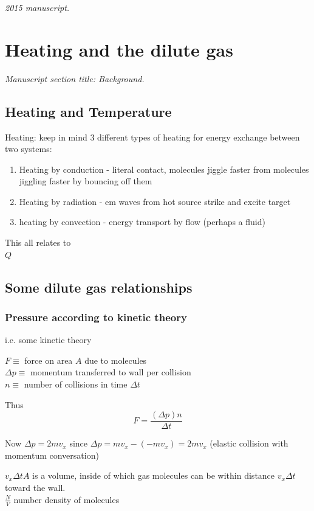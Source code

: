 \noindent\textit{2015 manuscript.}

\section{Heating and the dilute gas}
\noindent\textit{Manuscript section title: Background.}
\cite{RBaierlein1999}
\subsection{Heating and Temperature}

Heating: keep in mind 3 different types of heating for energy exchange between two systems:

\begin{enumerate}
  \item Heating by conduction - literal contact, molecules jiggle faster from molecules jiggling faster by bouncing off them
  \item Heating by radiation - em waves from hot source strike and excite target
  \item heating by convection - energy transport by flow (perhaps a fluid)
\end{enumerate}

This all relates to \\
$Q$

\subsection{Some dilute gas relationships}
\label{sec:dilute-gas}

\subsubsection*{Pressure according to kinetic theory} i.e. some kinetic theory

$F \equiv $ force on area $A$ due to molecules \\
$\Delta p \equiv $ momentum transferred to wall per collision \\
$n \equiv$ number of collisions in time $\Delta t$

Thus
\[
F = \frac{ (\Delta p)n }{ \Delta t }
\]

Now $\Delta p = 2 m v_x$ since $\Delta p = mv_x - (-mv_x) = 2mv_x$ (elastic collision with momentum conversation)

$v_x \Delta t A$ is a volume, inside of which gas molecules can be within distance $v_x \Delta t$ toward the wall.  \\
$\frac{N}{V}$ number density of molecules

